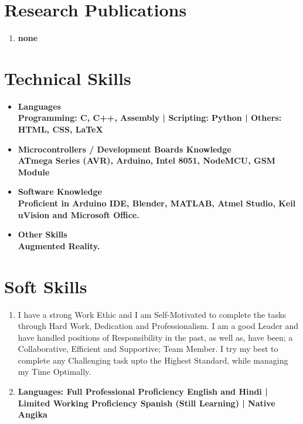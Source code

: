 \documentclass[11pt]{article}
\begin{document}
\begin{minipage}{18cm}
\begin{itemize}[leftmargin=*]
\end{itemize}

\section{Research Publications}
\begin{enumerate}[leftmargin=*]
\item \bfseries none\\
\end{enumerate}

\section{Technical Skills}
\begin{itemize}[leftmargin=*]
\item \bfseries Languages\\
Programming: \mdseries C, C++, Assembly | 
\bfseries Scripting: \mdseries Python | 
\bfseries Others: \mdseries HTML, CSS, \LaTeX\\

\item \bfseries Microcontrollers / Development Boards Knowledge\\
\mdseries ATmega Series (AVR), Arduino, Intel 8051, NodeMCU, GSM Module\\

\item \bfseries Software Knowledge\\
\mdseries Proficient in Arduino IDE, Blender, MATLAB, Atmel Studio, Keil uVision and Microsoft Office.\\

\item \bfseries Other Skills\\
\mdseries Augmented Reality.\\
\end{itemize}

\fontsize{10pt}{13pt}\selectfont
\section{Soft Skills}
\begin{enumerate}[leftmargin=*]
\item  I have a strong Work Ethic and I am Self-Motivated to complete the tasks through Hard Work, Dedication and Professionalism. I am a good Leader and have handled positions of Responsibility in the past, as well as, have been; a Collaborative, Efficient and Supportive; Team Member. I try my best to complete any Challenging task upto the Highest Standard, while managing my Time Optimally.\\

\item \bfseries Languages: 
Full Professional Proficiency \mdseries English and Hindi | \bfseries Limited Working Proficiency \mdseries Spanish (Still Learning) | \bfseries Native \mdseries Angika
\end{enumerate}

\end{minipage}
\pagebreak
\end{document}
